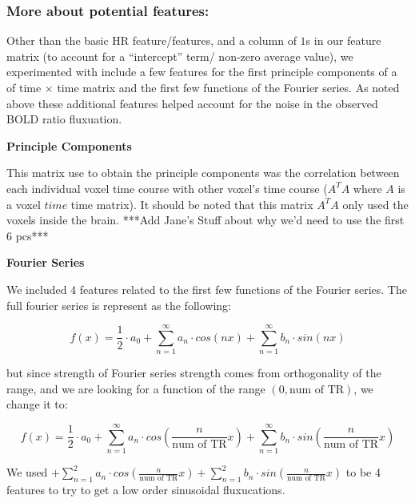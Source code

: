 \subsubsection{More about potential features:}
\par Other than the basic HR feature/features, and a column of $1$s in our feature matrix
(to account for a ``intercept'' term/ non-zero average value), we experimented with 
include a few features for the first principle components of a of time $\times$ time 
matrix and the first few functions of the Fourier series.  As noted above these 
additional features helped account for the noise in the observed BOLD ratio 
fluxuation.

\vspace{2mm}
\textbf{Principle Components}
\vspace{2mm}
\par This matrix use to obtain the principle components was the correlation between 
each individual voxel time course with other voxel's time course ($A^TA$ where 
$A$ is a voxel $time$ time matrix). It should be noted that this matrix $A^TA$ only 
used the voxels inside the brain. ***Add Jane's Stuff about why we'd need to
use the first 6 pcs***

\vspace{2mm}
\textbf{Fourier Series}
\vspace{2mm}
\par We included 4 features related to the first few functions of the Fourier series.
The full fourier series is represent as the following:

\begin{equation}
f(x) = \frac{1}{2} \cdot a_0 + \sum_{n=1}^{\infty} a_n \cdot cos(n x) + \sum_{n=1}^{\infty} b_n \cdot  sin(n x)
\end{equation}

but since strength of Fourier series strength comes from orthogonality of the range, 
and we are looking for a function of the range $(0, \text{num of TR})$, we change it to:

\begin{equation}
f(x) = \frac{1}{2} \cdot a_0 + \sum_{n=1}^{\infty} a_n \cdot cos(\frac{n}{\text{num of TR}} x) + \sum_{n=1}^{\infty} b_n \cdot sin(\frac{n}{\text{num of TR}} x)
\end{equation}

We used $ + \sum_{n=1}^{2} a_n \cdot cos(\frac{n}{\text{num of TR}} x) + 
\sum_{n=1}^{2} b_n \cdot sin(\frac{n}{\text{num of TR}} x)$ to be 4 features to try 
to get a low order sinusoidal fluxucations.

